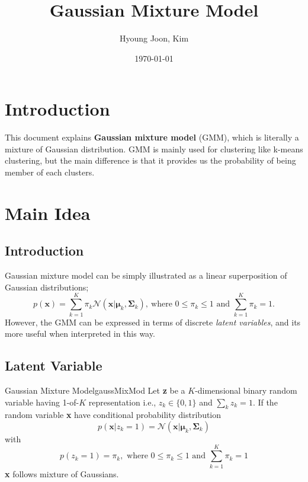 \documentclass{article}
\title{Gaussian Mixture Model}
\author{Hyoung Joon, Kim}
\date{\today}
\begin{document}
\maketitle
\tableofcontents
\newpage

\section{Introduction}
    This document explains \textbf{Gaussian mixture model} (GMM), which is literally a mixture of Gaussian distribution.
    GMM is mainly used for clustering like k-means clustering, but the main difference is that it provides us the probability of being member of each clusters.

\section{Main Idea}
    \subsection{Introduction}
        Gaussian mixture model can be simply illustrated as a linear superposition of Gaussian distributions;
        \[
        p(\textbf{x})=\sum_{k=1}^{K}\pi_k\mathcal{N}(\textbf{x}|\bm\mu_k, \bm\Sigma_k),\ 
        \text{where $0 \leq \pi_k \leq 1$ and $\sum_{k=1}^{K}\pi_k = 1$}.
        \]
        However, the GMM can be expressed in terms of discrete \emph{latent variables}, and its more useful when interpreted in this way.
    \subsection{Latent Variable}
        \begin{defn}{Gaussian Mixture Model}{gaussMixMod}
            Let \textbf{z} be a $K$-dimensional binary random variable having 1-of-$K$ representation i.e.,
            $z_k \in \{0,1\}$ and $\sum_k z_k=1$. If the random variable \textbf{x} have conditional probability distribution
            \[
            p(\mathbf{x}|z_k=1) = \mathcal{N}(\mathbf{x}|\bm\mu_k,\bm\Sigma_k)
            \]
            with
            \[
            p(z_k=1)=\pi_k,\text{ where } 0 \leq \pi_k \leq 1 \text{ and } \sum_{k=1}^{K}\pi_k=1
            \]
            \textbf{x} follows mixture of Gaussians.
        \end{defn}
\end{document}
